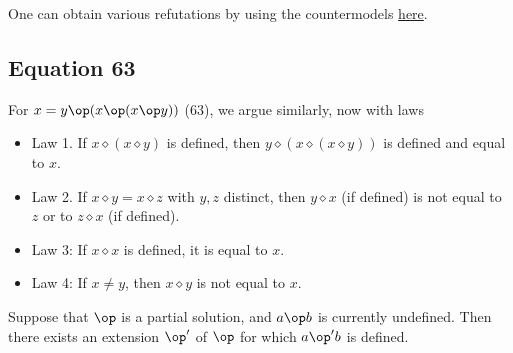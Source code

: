 One can obtain various refutations by using the countermodels \href{https://leanprover.zulipchat.com/#narrow/channel/458659-Equational/topic/713.2C.201289.2C.201447/near/483735768}{here}.

\subsection{Equation 63}


For $x = y \op (x \op (x \op y))$ (63), we argue similarly, now with laws
\begin{itemize}
  \item Law 1.  If $x \diamond (x \diamond y)$ is defined, then $y \diamond (x \diamond (x \diamond y))$ is defined and equal to $x$.
  \item Law 2.  If $x \diamond y = x \diamond z$ with $y,z$ distinct, then $y \diamond x$ (if defined) is not equal to $z$ or to $z \diamond x$ (if defined).
  \item Law 3: If $x \diamond x$ is defined, it is equal to $x$.
  \item Law 4: If $x \neq y$, then $x \diamond y$ is not equal to $x$.
\end{itemize}
\begin{lemma}[63 extension]\label{63-extension}  Suppose that $\op$ is a partial solution, and $a \op b$ is currently undefined.  Then there exists an extension $\op'$ of $\op$ for which $a \op' b$ is defined.
\end{lemma}
